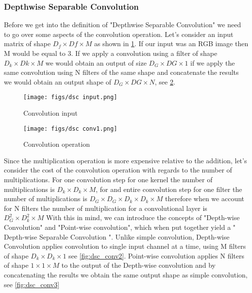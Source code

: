 \subsubsection{Depthwise Separable Convolution}
Before we get into the definition of "Depthwise Separable Convolution" we need to go over some aspects of the convolution operation. Let's consider an input matrix of shape $D_{f} \times D{f} \times M $ as shown in \cref{fig:dsc_input}. If our input was an RGB image then M would be equal to 3. If we apply a convolution using a filter of shape $D_{k} \times D{k} \times M $ we would obtain an output of size $D_{G} \times D{G} \times 1 $ if we apply the same convolution using N filters of the same shape and concatenate the results we would obtain an output shape of $D_{G} \times D{G} \times N $, see \cref{fig:dsc_conv1}.

\begin{figure}[ht]
	\centering
	\texttt{[image: figs/dsc input.png]}
	\caption{Convolution input }\label{fig:dsc_input}
\end{figure}

\begin{figure}[ht]
	\centering
	\texttt{[image: figs/dsc conv1.png]}
	\caption{Convolution operation }\label{fig:dsc_conv1}
\end{figure}

Since the multiplication operation is more expensive relative to the addition, let's consider the cost of the convolution operation with regards to the number of multiplications. For one convolution step for one kernel the number of multiplications is $D_{k} \times D_{k} \times M $, for and entire convolution step for one filter the number of multiplications is $D_{G} \times D_{G} \times D_{k} \times D_{k} \times M $ therefore when we account for N filters the number of multiplication for a convolutional layer is $D_{G}^{2} \times D_{k}^{2} \times M $
With this in mind, we can introduce the concepts of "Depth-wise Convolution" and "Point-wise convolution", which when put together yield a " Depth-wise Separable Convolution ". Unlike simple convolution, Depth-wise Convolution applies convolution to single input channel at a time, using M filters of shape  $D_{k} \times D_{k} \times 1 $ see \cref{fig:dsc_conv2}. Point-wise convolution applies N filters of shape $1 \times 1 \times M $ to the output of the Depth-wise convolution and by concatenating the results we obtain the same output shape as simple convolution, see \cref{fig:dsc_conv3}

